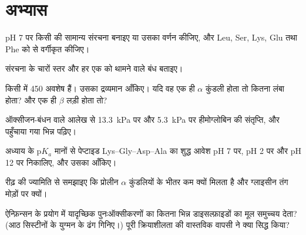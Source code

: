 \section{अभ्यास}

\begin{exercise}[$\star$]\label{exo:b1:proteins:1}
pH 7 पर किसी  की सामान्य संरचना बनाइए या उसका वर्णन कीजिए, और
Leu, Ser, Lys, Glu तथा Phe को  से वर्गीकृत कीजिए।
\end{exercise}

\begin{exercise}[$\star$]\label{exo:b1:proteins:2}
 संरचना के चारों स्तर और हर एक को थामने वाले बंध बताइए।
\end{exercise}

\begin{exercise}[$\star$]\label{exo:b1:proteins:3}
किसी  में \qty{450}{} अवशेष हैं। उसका द्रव्यमान आँकिए। यदि वह एक
ही $\alpha$ कुंडली होता तो कितना लंबा होता? और एक ही $\beta$ लड़ी होता तो?
\end{exercise}

\begin{exercise}[$\star$]\label{exo:b1:proteins:4}
ऑक्सीजन-बंधन वाले आलेख से \qty{13.3}{kPa} पर और \qty{5.3}{kPa} पर
हीमोग्लोबिन की संतृप्ति, और पहुँचाया गया भिन्न पढ़िए।
\end{exercise}

\begin{exercise}[$\star\star$]\label{exo:b1:proteins:5}
अध्याय के p$K_a$ मानों से पेप्टाइड Lys--Gly--Asp--Ala का शुद्ध आवेश pH 7
पर, pH 2 पर और pH 12 पर निकालिए, और उसका  आँकिए।
\end{exercise}

\begin{exercise}[$\star\star$]\label{exo:b1:proteins:6}
रीढ़ की ज्यामिति से समझाइए कि प्रोलीन $\alpha$ कुंडलियों के भीतर कम
क्यों मिलता है और ग्लाइसीन तंग मोड़ों पर क्यों।
\end{exercise}

\begin{exercise}[$\star\star$]\label{exo:b1:proteins:7}
ऐन्फ़िन्सन के प्रयोग में यादृच्छिक पुनःऑक्सीकरणों का कितना भिन्न
डाइसल्फ़ाइडों का मूल समुच्चय देता? (आठ सिस्टीनों के युग्मन के ढंग
गिनिए।) पूरी क्रियाशीलता की वास्तविक वापसी ने क्या सिद्ध किया?
\end{exercise}


